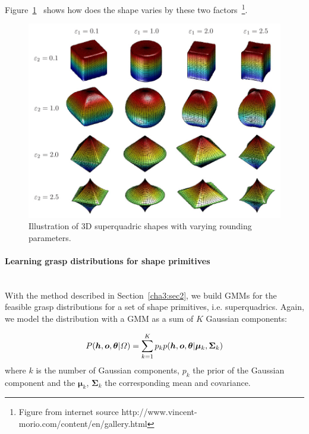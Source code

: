 Figure~\ref{fig:sq}~ shows how does the shape varies by these two factors~\footnote{Figure from internet source http://www.vincent-morio.com/content/en/gallery.html}.

\begin{figure}
  \centering
  \includegraphics[width=14cm]{./fig_cha3/superquadrics.jpg}
  \caption{Illustration of 3D superquadric shapes with varying rounding parameters\protect\footnotemark.}
  \label{fig:sq}
\end{figure}


\paragraph{Learning grasp distributions for shape primitives}
~\\

With the method described in Section~\ref{cha3:sec2}, we build GMMs for the feasible grasp distributions for a set of shape primitives, i.e. superquadrics. Again, we model the distribution with a GMM as a sum of $K$ Gaussian components:

\begin{equation}
{
P (\boldsymbol{h},\boldsymbol{o},\boldsymbol\theta \text{\textbar} \varOmega)
= \sum_{k=1}^K {p_{k}p(\boldsymbol{h},\boldsymbol{o},\boldsymbol{\theta} \text{\textbar} {\boldsymbol{\mu}_k}, {\boldsymbol{\Sigma}_k})}
}
\end{equation}
where $k$ is the number of Gaussian components, $p_k$ the prior of the Gaussian component and the $\boldsymbol{\mu}_k$, $\boldsymbol{\Sigma}_k$ the corresponding mean and covariance.

